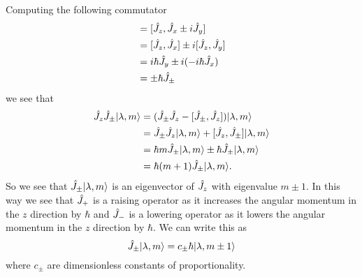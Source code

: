 \documentclass[a4paper]{article}
\renewcommand{\ket}[1]{\vert {#1} \rangle}
\theoremstyle{definition}
\begin{document}
    Computing the following commutator
    \begin{align*}
        [\operator{J}_z, \operator{J}_{\pm}] &= [\operator{J}_z, \operator{J}_x \pm i\operator{J}_y]\\
        &= [\operator{J}_z, \operator{J}_x] \pm i[\operator{J}_z, \operator{J}_y]\\
        &= i\hbar\operator{J}_y \pm i(-i\hbar\operator{J}_x)\\
        &= \pm\hbar\operator{J}_{\pm}
    \end{align*}
    we see that
    \begin{align*}
        \operator{J}_z\operator{J}_{\pm}\ket{\lambda, m} &= (\operator{J}_{\pm}\operator{J}_z - [\operator{J}_{\pm}, \operator{J}_z])\ket{\lambda, m}\\
        &= \operator{J}_{\pm}\operator{J}_z\ket{\lambda, m} + [\operator{J}_z, \operator{J}_{\pm}]\ket{\lambda, m}\\
        &= \hbar m\operator{J}_{\pm}\ket{\lambda, m} \pm \hbar\operator{J}_{\pm}\ket{\lambda, m}\\
        &= \hbar(m + 1)\operator{J}_{\pm}\ket{\lambda, m}.
    \end{align*}
    So we see that \(\operator{J}_{\pm}\ket{\lambda, m}\) is an eigenvector of \(\hat{J}_z\) with eigenvalue \(m \pm 1\).
    In this way we see that \(\hat{J}_+\) is a raising operator as it increases the angular momentum in the \(z\) direction by \(\hbar\) and \(\hat{J}_-\) is a lowering operator as it lowers the angular momentum in the \(z\) direction by \(\hbar\).
    We can write this as
    \[\operator{J}_{\pm}\ket{\lambda, m} = c_{\pm}\hbar\ket{\lambda, m \pm 1}\]
    where \(c_{\pm}\) are dimensionless constants of proportionality.
    
\end{document}
